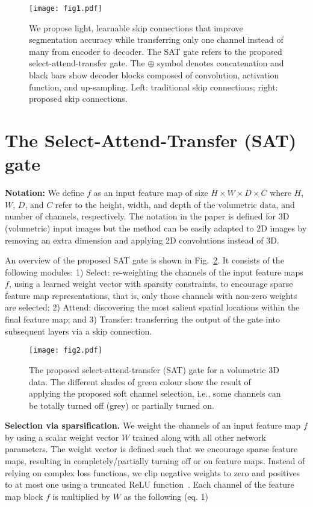 \documentclass{article}
\begin{document}
\begin{figure}
\centering
\texttt{[image: fig1.pdf]}
\caption{We propose light, learnable skip connections that improve segmentation accuracy while transferring only one channel instead of many from encoder to decoder. The SAT gate refers to the proposed select-attend-transfer gate. The $\oplus$ symbol denotes concatenation and black bars show decoder blocks composed of convolution, activation function, and up-sampling. Left: traditional skip connections; right: proposed skip connections.}
\label{figure1}
\end{figure}

\section{The Select-Attend-Transfer (SAT) gate}

\textbf{Notation:} We define $f$ as an input feature map of size $H\times W\times D\times C$ where $H$, $W$, $D$, and $C$ refer to the height, width, and depth of the volumetric data, and number of channels, respectively. The notation in the paper is defined for 3D (volumetric) input images but the method can be easily adapted to 2D images by removing an extra dimension and applying 2D convolutions instead of 3D.

\noindent An overview of the proposed SAT gate is shown in Fig.~\ref{fig2}. It consists of the following modules: 1) Select: re-weighting the channels of the input feature maps $f$, using a learned weight vector with sparsity constraints, to encourage sparse feature map representations, that is, only those channels with non-zero weights are selected; 2) Attend: discovering the most salient spatial locations within the final feature map; and 3) Transfer: transferring the output of the gate into subsequent layers via a skip connection.

\begin{figure}
\centering
\texttt{[image: fig2.pdf]}
\caption{The proposed select-attend-transfer (SAT) gate for a volumetric 3D data. The different shades of green colour show the result of applying the proposed soft channel selection, i.e., some channels can be totally turned off (grey) or partially turned on.}
\label{fig2}
\end{figure}

\noindent \textbf{Selection via sparsification.} We weight the channels of an input feature map $f$ by using a scalar weight vector $W$ trained along with all other network parameters. The weight vector is defined such that we encourage sparse feature maps, resulting in completely/partially turning off or on feature maps. Instead of relying on complex loss functions, we clip negative weights to zero and positives to at most one using a truncated ReLU function~\cite{lecun2015deep}. Each channel of the feature map block $f$ is multiplied by $W$ as the following (eq. 1)
\end{document}
